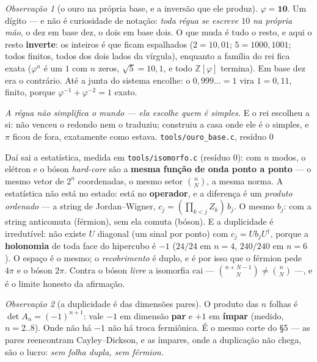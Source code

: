 \documentclass[11pt]{article}
\newcommand{\code}[1]{\texttt{\small #1}}
\newcommand{\Z}{\mathbb Z}
\theoremstyle{plain}
\theoremstyle{remark}
\newtheorem{obs}{Observação}
\begin{document}
\begin{obs}[o ouro na própria base, e a inversão que ele produz]\label{obs:ourobase}
$\varphi=\mathbf{10}$. Um dígito --- e não é curiosidade de notação: \emph{toda régua se escreve
$10$ na própria mão}, o dez em base dez, o dois em base dois. O que muda é tudo o resto, e aqui o
resto \textbf{inverte}: os inteiros é que ficam espalhados ($2=10{,}01$; $5=1000{,}1001$; todos
finitos, todos dos dois lados da vírgula), enquanto a família do rei fica exata ($\varphi^n$ é um $1$
com $n$ zeros, $\sqrt5=10{,}1$, e todo $\Z[\varphi]$ termina). Em base dez era o contrário. Até a
junta do sistema encolhe: o $0{,}999\ldots=1$ vira $1=0{,}11$, finito, porque
$\varphi^{-1}+\varphi^{-2}=1$ exato.

\emph{A régua não simplifica o mundo --- ela escolhe quem é simples.} E o rei escolheu a si: não
venceu o redondo nem o traduziu; construiu a casa onde ele é o simples, e $\pi$ ficou de fora,
exatamente como estava. \hfill{\small\code{tools/ouro\_base.c}, resíduo $0$}
\end{obs}

Daí sai a estatística, medida em \code{tools/isomorfo.c} (resíduo $0$): com $n$ modos, o elétron e o
bóson \emph{hard-core} são a \textbf{mesma função de onda ponto a ponto} --- o mesmo vetor de $2^n$
coordenadas, o mesmo setor $\binom{n}{N}$, a mesma norma. A estatística não está no estado: está no
\textbf{operador}, e a diferença é um \emph{produto ordenado} --- a string de Jordan--Wigner,
$c_j=(\prod_{k<j}Z_k)\,b_j$. O mesmo $b_j$: com a string anticomuta (férmion), sem ela comuta (bóson).
E a duplicidade é irredutível: não existe $U$ diagonal (um sinal por ponto) com $c_j=Ub_jU^\dagger$,
porque a \textbf{holonomia} de toda face do hipercubo é $-1$ ($24/24$ em $n=4$, $240/240$ em $n=6$).
O espaço é o mesmo; o \emph{recobrimento} é duplo, e é por isso que o férmion pede $4\pi$ e o bóson
$2\pi$. Contra o bóson \emph{livre} a isomorfia cai --- $\binom{n+N-1}{N}\neq\binom{n}{N}$ ---, e é o
limite honesto da afirmação.

\begin{obs}[a duplicidade é das dimensões pares]\label{obs:dupla}
O produto das $n$ folhas é $\det A_n=(-1)^{n+1}$: vale $-1$ em dimensão \textbf{par} e $+1$ em
\textbf{ímpar} (medido, $n=2..8$). Onde não há $-1$ não há troca fermiônica. É o mesmo corte do §5 ---
as pares reencontram Cayley--Dickson, e as ímpares, onde a duplicação não chega, são o lucro:
\emph{sem folha dupla, sem férmion}.
\end{obs}
\end{document}
